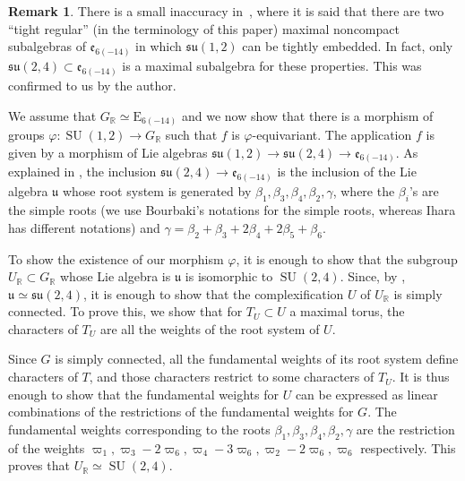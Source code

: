 \documentclass[10pt]{amsart}
\newcommand{\citestar}[3]{\cite[#3]{#1}}
\theoremstyle{plain}
\theoremstyle{definition}
\newtheorem{rema}[theo]{Remark}
\DeclareMathOperator{\SU}{SU}
\newcommand{\bR}{\mathbb{R}}
\newcommand{\fe}{\mathfrak{e}}
\newcommand{\fsu}{\mathfrak{su}}
\newcommand{\fu}{\mathfrak{u}}
\begin{document}
\begin{rema}
There is a small inaccuracy in~\cite{Hamlet}, where it is said that there are
two ``tight regular'' (in the terminology of this paper) maximal noncompact subalgebras of
${\fe}_{6(-14)}$ in which $\fsu(1,2)$ can be tightly embedded. In fact, only $\fsu(2,4)\subset
{\fe}_{6(-14)}$ is a maximal subalgebra for
these properties. This was confirmed to us by the
author.
\end{rema}

We assume that $G_\bR \simeq \mathrm{E}_{6(-14)}$ and
we now show that there is a morphism of groups $\varphi:\SU(1,2) \to G_\bR$ such that $f$ is
$\varphi$-equivariant. The application $f$ is given by a morphism
of Lie algebras $\fsu(1,2) \to \fsu(2,4) \to \fe_{6(-14)}$.
As explained in \citestar{ihara}*{},
the inclusion $\fsu(2,4) \to \fe_{6(-14)}$ is the
inclusion of the Lie algebra $\fu$ whose root system is generated by
$\beta_1,\beta_3,\beta_4,\beta_2,\gamma$, where the $\beta_i$'s are the simple roots
(we use Bourbaki's notations for the simple roots,
whereas Ihara has different notations) and
$\gamma=\beta_2+\beta_3+2\beta_4+2\beta_5+\beta_6$.

To show the existence of our morphism $\varphi$, it is enough to show that the
subgroup $U_\bR \subset G_\bR$ whose Lie algebra is $\fu$ is isomorphic to $\SU(2,4)$.
Since, by \citestar{ihara}*{}, $\fu \simeq \fsu(2,4)$, it is enough to show that
the complexification $U$ of $U_\bR$ is simply connected. To prove this, we show that for $T_U \subset U$
a maximal torus, the characters of $T_U$ are all the weights of the root system of $U$.

Since $G$ is simply connected, all the fundamental weights of its root system define characters of $T$, and
those characters restrict to some characters of $T_U$. It is thus enough to show that the fundamental weights
for $U$ can be expressed as linear combinations of the restrictions of the fundamental weights for $G$.
The fundamental weights corresponding to the roots $\beta_1,\beta_3,\beta_4,\beta_2,\gamma$ are the restriction
of the weights $\varpi_1,\varpi_3-2\varpi_6,\varpi_4-3\varpi_6,\varpi_2-2\varpi_6,\varpi_6$
respectively. This proves that $U_\bR \simeq \SU(2,4)$.
\end{document}
